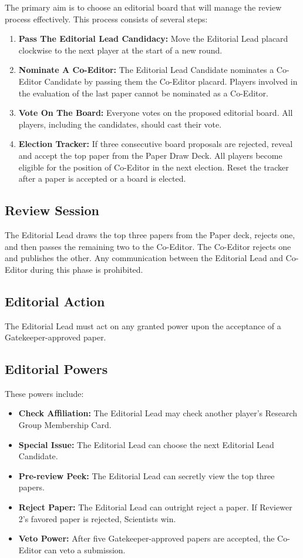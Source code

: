 \documentclass[sigplan,screen,nonacm]{acmart}
\begin{document}
The primary aim is to choose an editorial board that will manage the review process effectively. This process consists of several steps:

\begin{enumerate}
	\item \textbf{Pass The Editorial Lead Candidacy:} Move the Editorial Lead placard clockwise to the next player at the start of a new round.
	\item \textbf{Nominate A Co-Editor:} The Editorial Lead Candidate nominates a Co-Editor Candidate by passing them the Co-Editor placard. Players involved in the evaluation of the last paper cannot be nominated as a Co-Editor.
	\item \textbf{Vote On The Board:} Everyone votes on the proposed editorial board. All players, including the candidates, should cast their vote.
	\item \textbf{Election Tracker:} If three consecutive board proposals are rejected, reveal and accept the top paper from the Paper Draw Deck. All players become eligible for the position of Co-Editor in the next election. Reset the tracker after a paper is accepted or a board is elected.
\end{enumerate}

\subsection{Review Session}

The Editorial Lead draws the top three papers from the Paper deck, rejects one, and then passes the remaining two to the Co-Editor. The Co-Editor rejects one and publishes the other. Any communication between the Editorial Lead and Co-Editor during this phase is prohibited.

\subsection{Editorial Action}

The Editorial Lead must act on any granted power upon the acceptance of a Gatekeeper-approved paper.

\subsection{Editorial Powers}

These powers include:
\begin{itemize}
	\item \textbf{Check Affiliation:} The Editorial Lead may check another player's Research Group Membership Card.
	\item \textbf{Special Issue:} The Editorial Lead can choose the next Editorial Lead Candidate.
	\item \textbf{Pre-review Peek:} The Editorial Lead can secretly view the top three papers.
	\item \textbf{Reject Paper:} The Editorial Lead can outright reject a paper. If Reviewer 2's favored paper is rejected, Scientists win.
	\item \textbf{Veto Power:} After five Gatekeeper-approved papers are accepted, the Co-Editor can veto a submission.
\end{itemize}




\end{document}

